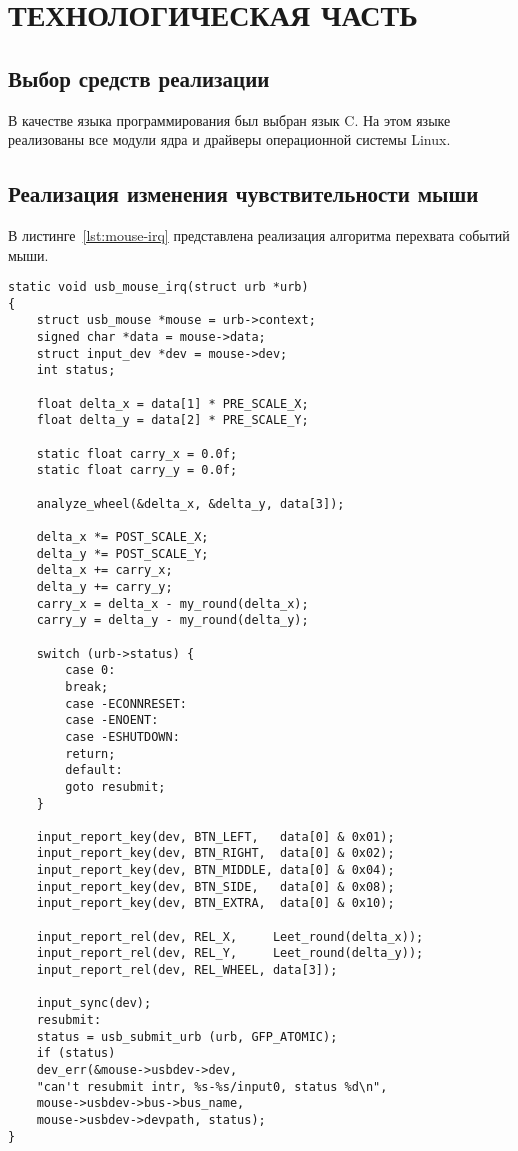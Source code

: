 \chapter{ТЕХНОЛОГИЧЕСКАЯ ЧАСТЬ}

\section{Выбор средств реализации}

В качестве языка программирования был выбран язык C. На этом языке
реализованы все модули ядра и драйверы операционной системы Linux.

\section{Реализация изменения чувствительности мыши}

В листинге~\ref{lst:mouse-irq} представлена реализация алгоритма перехвата событий мыши. 

\captionsetup{justification=raggedright,singlelinecheck=off}
\begin{lstlisting}[label=lst:mouse-irq, caption= Реализация алгоритма перехвата событий мыши]
static void usb_mouse_irq(struct urb *urb)
{
	struct usb_mouse *mouse = urb->context;
	signed char *data = mouse->data;
	struct input_dev *dev = mouse->dev;
	int status;
	
	float delta_x = data[1] * PRE_SCALE_X;
	float delta_y = data[2] * PRE_SCALE_Y;
	
	static float carry_x = 0.0f;
	static float carry_y = 0.0f;
	
	analyze_wheel(&delta_x, &delta_y, data[3]);
	
	delta_x *= POST_SCALE_X;
	delta_y *= POST_SCALE_Y;
	delta_x += carry_x;
	delta_y += carry_y;
	carry_x = delta_x - my_round(delta_x);
	carry_y = delta_y - my_round(delta_y);
	
	switch (urb->status) {
		case 0:	
		break;
		case -ECONNRESET:
		case -ENOENT:
		case -ESHUTDOWN:
		return;
		default:
		goto resubmit;
	}
	
	input_report_key(dev, BTN_LEFT,   data[0] & 0x01);
	input_report_key(dev, BTN_RIGHT,  data[0] & 0x02);
	input_report_key(dev, BTN_MIDDLE, data[0] & 0x04);
	input_report_key(dev, BTN_SIDE,   data[0] & 0x08);
	input_report_key(dev, BTN_EXTRA,  data[0] & 0x10);
	
	input_report_rel(dev, REL_X,     Leet_round(delta_x));
	input_report_rel(dev, REL_Y,     Leet_round(delta_y));
	input_report_rel(dev, REL_WHEEL, data[3]);
	
	input_sync(dev);
	resubmit:
	status = usb_submit_urb (urb, GFP_ATOMIC);
	if (status)
	dev_err(&mouse->usbdev->dev,
	"can't resubmit intr, %s-%s/input0, status %d\n",
	mouse->usbdev->bus->bus_name,
	mouse->usbdev->devpath, status);
}
\end{lstlisting}

